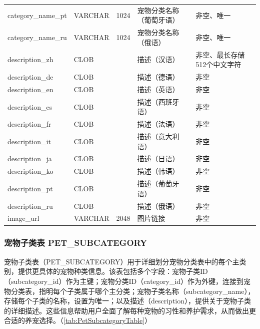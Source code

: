 \begin{longtable}[c]{@{}llrll@{}}
    category\_name\_pt & VARCHAR       & 1024        & 宠物分类名称（葡萄牙语） & 非空、唯一             \\
    category\_name\_ru & VARCHAR       & 1024        & 宠物分类名称（俄语）   & 非空、唯一             \\
    description\_zh    & CLOB          &             & 描述（汉语）       & 非空、最长存储512个中文字符   \\
    description\_de    & CLOB          &             & 描述（德语）       & 非空                \\
    description\_en    & CLOB          &             & 描述（英语）       & 非空                \\
    description\_es    & CLOB          &             & 描述（西班牙语）     & 非空                \\
    description\_fr    & CLOB          &             & 描述（法语）       & 非空                \\
    description\_it    & CLOB          &             & 描述（意大利语）     & 非空                \\
    description\_ja    & CLOB          &             & 描述（日语）       & 非空                \\
    description\_ko    & CLOB          &             & 描述（韩语）       & 非空                \\
    description\_pt    & CLOB          &             & 描述（葡萄牙语）     & 非空                \\
    description\_ru    & CLOB          &             & 描述（俄语）       & 非空                \\
    image\_url         & VARCHAR       & 2048        & 图片链接         & 非空                \\ \bottomrule
\end{longtable}

\subsubsection{宠物子类表 PET\_SUBCATEGORY}

宠物子类表（PET\_SUBCATEGORY）用于详细划分宠物分类表中的每个主类别，提供更具体的宠物种类信息。该表包括多个字段：宠物子类ID（subcategory\_id）作为主键；宠物分类ID（category\_id）作为外键，连接到宠物分类表，指明每个子类属于哪个主分类；宠物子类名称（subcategory\_name），存储每个子类的名称，设置为唯一；以及描述（description），提供关于宠物子类的详细描述。这些信息帮助用户全面了解每种宠物的习性和养护需求，从而做出更合适的养宠选择。（\cref{tab:PetSubcategoryTable}）

